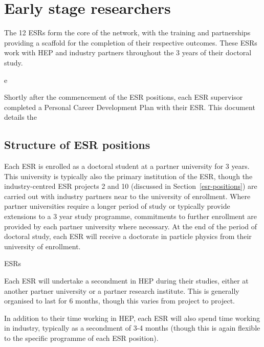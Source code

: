 \section{Early stage researchers}
\label{esrs}
The 12 ESRs form the core of the network, with the training and partnerships providing a scaffold for the completion of their respective outcomes. These ESRs work with HEP and industry partners throughout the 3 years of their doctoral study.\par
e\par
Shortly after the commencement of the ESR positions, each ESR supervisor completed a Personal Career Development Plan with their ESR. This document details the 

\subsection{Structure of ESR positions}
\label{esr-structure}
Each ESR is enrolled as a doctoral student at a partner university for 3 years. This university is typically also the primary institution of the ESR, though the industry-centred ESR projects 2 and 10 (discussed in Section~\ref{esr-positions}) are carried out with industry partners near to the university of enrollment. Where partner universities require a longer period of study or typically provide extensions to a 3 year study programme, commitments to further enrollment are provided by each partner university where necessary. At the end of the period of doctoral study, each ESR will receive a doctorate in particle physics from their university of enrollment.\par
ESRs\par


Each ESR will undertake a secondment in HEP during their studies, either at another partner university or a partner research institute. This is generally organised to last for 6 months, though this varies from project to project.\par


In addition to their time working in HEP, each ESR will also spend time working in industry, typically as a secondment of 3-4 months (though this is again flexible to the specific programme of each ESR position).

